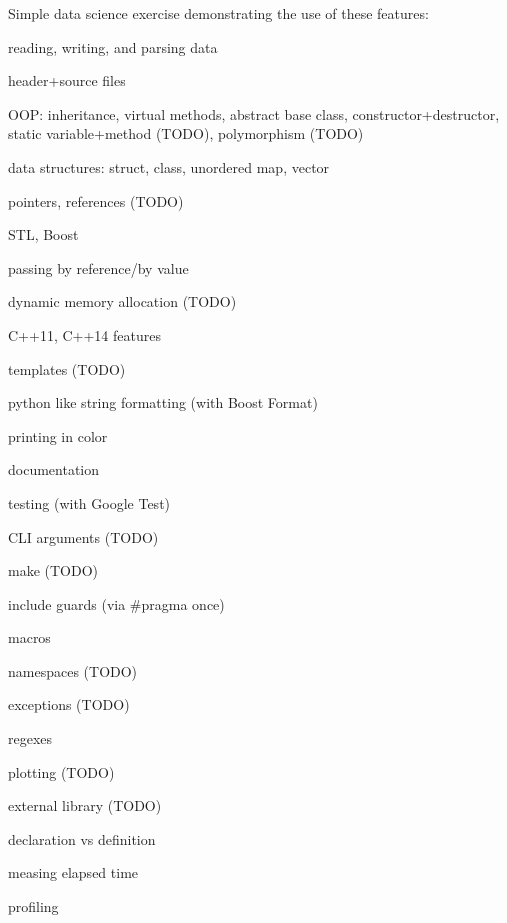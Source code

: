 Simple data science exercise demonstrating the use of these features\+:


\begin{DoxyItemize}
\item reading, writing, and parsing data
\item header+source files
\item O\+OP\+: inheritance, virtual methods, abstract base class, constructor+destructor, static variable+method (T\+O\+DO), polymorphism (T\+O\+DO)
\item data structures\+: struct, class, unordered map, vector
\item pointers, references (T\+O\+DO)
\item S\+TL, Boost
\item passing by reference/by value
\item dynamic memory allocation (T\+O\+DO)
\item C++11, C++14 features
\item templates (T\+O\+DO)
\item python like string formatting (with Boost Format)
\item printing in color
\item documentation
\item testing (with Google Test)
\item C\+LI arguments (T\+O\+DO)
\item make (T\+O\+DO)
\item include guards (via \#pragma once)
\item macros
\item namespaces (T\+O\+DO)
\item exceptions (T\+O\+DO)
\item regexes
\item plotting (T\+O\+DO)
\item external library (T\+O\+DO)
\item declaration vs definition
\item measing elapsed time
\item profiling
\end{DoxyItemize}

